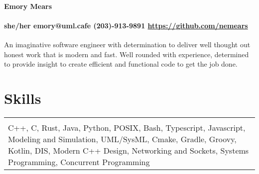 \documentclass[11pt]{article}
\begin{document}
\paragraph{\centering \huge Emory Mears \\ }
\paragraph{\centering she/her emory@uml.cafe (203)-913-9891 \url{https://github.com/nemears}\\}

An imaginative software engineer with determination to deliver well thought out honest work that is modern and fast. Well rounded with experience, 
determined to provide insight to create efficient and functional code to get the job done. 

\section*{Skills}
\begin{tabular}{p{18.5cm}}
  \hline
  \multicolumn{1}{c}{} \\
  C++, C, Rust, Java, Python, POSIX, Bash, Typescript, Javascript, Modeling and Simulation, UML/SysML, Cmake, Gradle, Groovy, Kotlin, 
  DIS, Modern C++ Design, Networking and Sockets, Systems Programming, Concurrent Programming
\end{tabular}

\end{document}
